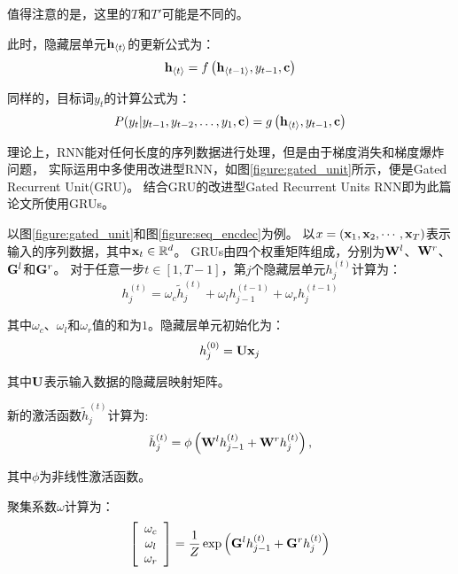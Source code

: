 值得注意的是，这里的$T$和$T'$可能是不同的。

此时，隐藏层单元$\mathbf{h}_{\left<t\right>}$的更新公式为：
\begin{equation}
    \mathbf{h}_{\left<t\right>} = f\left( \mathbf{h}_{\left<t-1\right>}, y_{t-1}, \mathbf{c} \right)
\end{equation}

同样的，目标词$y_t$的计算公式为：
\begin{equation}
    P(y_t | y_{t-1}, y_{t-2}, \ldots, y_1, \mathbf{c}) = g\left(\mathbf{h}_{\left<t\right>}, y_{t-1}, \mathbf{c} \right)
\end{equation}


理论上，RNN能对任何长度的序列数据进行处理，但是由于梯度消失和梯度爆炸问题，
实际运用中多使用改进型RNN，如图\ref{figure:gated_unit}所示，便是Gated Recurrent Unit(GRU)。
结合GRU的改进型Gated Recurrent Units RNN即为此篇论文所使用GRUs。

以图\ref{figure:gated_unit}和图\ref{figure:seq_encdec}为例。
以$x=(\mathbf{x}_1, \mathbf{x}_2, \cdots, \mathbf{x}_T)$表示输入的序列数据，其中$\mathbf{x}_t \in\mathbb{R}^d$。
GRUs由四个权重矩阵组成，分别为$\mathbf{W}^l$、$\mathbf{W}^r$、 $\mathbf{G}^l$和$\mathbf{G}^r$。
对于任意一步$t \in \left[ 1, T-1\right]$，第$j$个隐藏层单元$h^{(t)}_j$计算为：
\begin{equation}
    h^{(t)}_j = \omega_c \tilde{h}^{(t)}_j + \omega_l h^{(t-1)}_{j-1} + \omega_r h^{(t-1)}_j
\end{equation}

其中$\omega_c$、$\omega_l$和$\omega_r$值的和为$1$。隐藏层单元初始化为：
\begin{equation}
    h^{(0)}_j = \mathbf{U} \mathbf{x}_j
\end{equation}

其中$\mathbf{U}$表示输入数据的隐藏层映射矩阵。

新的激活函数$\tilde{h}^{(t)}_j$计算为:
\begin{equation}
    \tilde{h}^{(t)}_j = \phi\left( \mathbf{W}^l h^{(t)}_{j-1} + \mathbf{W}^r h^{(t)}_{j}
    \right),
\end{equation}

其中$\phi$为非线性激活函数。

聚集系数$\omega$计算为：
\begin{equation}
    \left[ 
        \begin{array}{c}
            \omega_c \\
            \omega_l \\
            \omega_r
        \end{array}
    \right] = \frac{1}{Z}
    \exp\left( \mathbf{G}^l h^{(t)}_{j-1} + \mathbf{G}^r h^{(t)}_{j}
    \right)
\end{equation}


